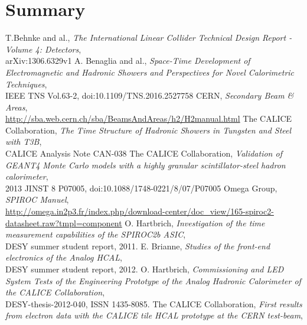 \documentclass[twoside,a4paper,11pt]{article}
\begin{document}
\section{Summary}

\clearpage

\begin{thebibliography}{10}
T.Behnke and al., \textit{The International Linear Collider Technical Design Report - Volume 4: Detectors}, \\
arXiv:1306.6329v1
	A. Benaglia and al., \textit{Space-Time Development of Electromagnetic and Hadronic Showers and Perspectives for Novel Calorimetric Techniques}, \\
	IEEE TNS Vol.63-2, doi:10.1109/TNS.2016.2527758
	CERN, \textit{Secondary Beam \& Areas}, \\
	\href{http://sba.web.cern.ch/sba/BeamsAndAreas/h2/H2manual.html}{http://sba.web.cern.ch/sba/BeamsAndAreas/h2/H2manual.html}
	The CALICE Collaboration, \textit{The Time Structure of Hadronic Showers in Tungsten and Steel with T3B}, \\
	CALICE Analysis Note CAN-038
	The CALICE Collaboration, \textit{Validation of GEANT4 Monte Carlo models with a highly granular scintillator-steel hadron calorimeter}, \\
	2013 JINST 8 P07005, doi:10.1088/1748-0221/8/07/P07005
	Omega Group, \textit{SPIROC Manuel}, \\
	\href{http://omega.in2p3.fr/index.php/download-center/doc_view/165-spiroc2-datasheet.raw?tmpl=component}{http://omega.in2p3.fr/index.php/download-center/doc\_view/165-spiroc2-datasheet.raw?tmpl=component}
	 O. Hartbrich, \textit{Investigation of the time measurement capabilities of the SPIROC2b ASIC}, \\
	 DESY summer student report, 2011.
	 E. Brianne, \textit{Studies of the front-end electronics of the Analog HCAL}, \\
	 DESY summer student report, 2012.
	 O. Hartbrich, \textit{Commissioning and LED System Tests of the Engineering Prototype of the Analog Hadronic Calorimeter of the CALICE Collaboration}, \\
	 DESY-thesis-2012-040, ISSN 1435-8085.
	 The CALICE Collaboration, \textit{First results from electron data with the CALICE tile HCAL prototype at the CERN test-beam}, \\

\end{thebibliography}
\end{document}
